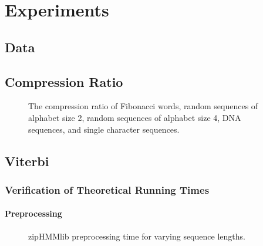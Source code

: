 \chapter{Experiments}
\label{cha:experiments}



\section{Data}
\label{sec:data}


\section{Compression Ratio}
\label{sec:compression-ratio}

\begin{figure}[H]
  \centering
  
  \caption{The compression ratio of Fibonacci words, random sequences of
    alphabet size 2, random sequences of alphabet size 4, DNA
    sequences, and single character sequences.}
  \label{fig:compression_ratio}
\end{figure}

\section{Viterbi}
\label{sec:viterbi}


\subsection{Verification of Theoretical Running Times}
\label{sec:theor-runn-times}

\subsubsection{Preprocessing}
\label{sec:preprocessing}

\begin{figure}[H]
  \centering
  
  \caption{zipHMMlib preprocessing time for varying sequence lengths.}
  \label{fig:pre_viterbi_n}
\end{figure}

%   

